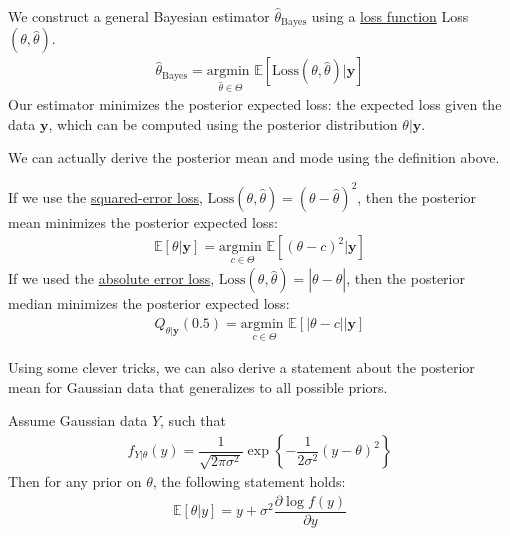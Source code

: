 \documentclass[12pt]{article}
\newcommand{\E}{\mathbb{E}}
\begin{document}
\medskip
\begin{tcolorbox}[breakable, title = \textbf{Definition}: Posterior expected loss]
    We construct a general Bayesian estimator $\hat\theta_\text{Bayes}$ using a \underline{loss function} Loss$(\theta,\hat\theta)$. 
    \begin{align*}
        \hat\theta_\text{Bayes}= \underset{\hat\theta \in \Theta}{\text{argmin }}\E[\text{Loss}(\theta,\hat\theta)|\textbf{y}]
    \end{align*}
    Our estimator minimizes the posterior expected loss: the expected loss given the data $\textbf{y}$, which can be computed using the posterior distribution $\theta|\textbf{y}$.
\end{tcolorbox}

\medskip

\noindent We can actually derive the posterior mean and mode using the definition above.

\medskip
\begin{tcolorbox}[breakable, title = \textbf{Theorem 9.3.3 in textbook}: \text{Origins of posterior mean, median}]
    If we use the \underline{squared-error loss}, $\text{Loss}(\theta,\hat\theta) =(\theta-\hat\theta)^2$, then the posterior mean minimizes the posterior expected loss:
    \begin{align*}
        \E[\theta|\textbf{y}] = \underset{c \in \Theta}{\text{argmin }}\E[(\theta-c)^2|\textbf{y}]
    \end{align*}
    If we used the \underline{absolute error loss}, $\text{Loss}(\theta,\hat\theta) = |\theta-\hat\theta|$, then the posterior median minimizes the posterior expected loss:
    \begin{align*}
        Q_{\theta|\textbf{y}}(0.5) = \underset{c \in \Theta}{\text{argmin }}\E[|\theta-c||\textbf{y}]
    \end{align*}
\end{tcolorbox}

\medskip
\noindent Using some clever tricks, we can also derive a statement about the posterior mean for Gaussian data that generalizes to all possible priors.

\medskip

\begin{tcolorbox}[breakable, title = \textbf{Example 9.3.4 in textbook}: Tweedie's formula]
    Assume Gaussian data $Y$, such that
    \begin{align*}
        f_{Y|\theta}(y)  = \dfrac{1}{\sqrt{2\pi\sigma^2}}\exp\left\{-\dfrac{1}{2\sigma^2}(y-\theta)^2\right\}
    \end{align*}
    Then for any prior on $\theta$, the following statement holds:
    \begin{align*}
        \boxed{\E[\theta|y]= y + \sigma^2 \dfrac{\partial\log f(y)}{\partial y}}
    \end{align*}
\end{tcolorbox}
\end{document}
